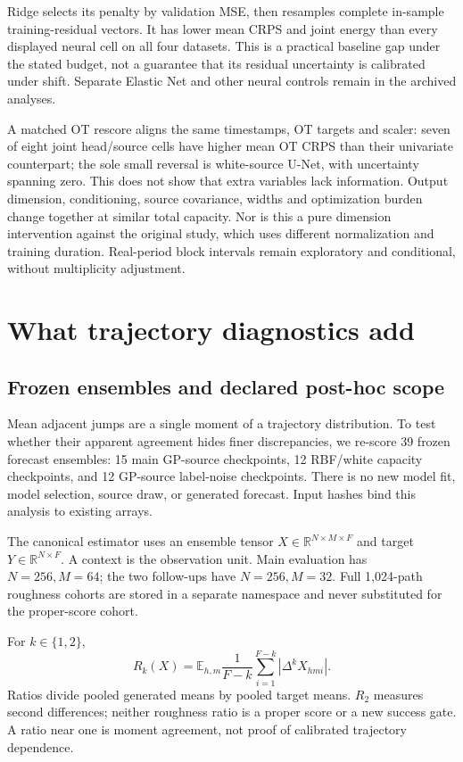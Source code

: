 \documentclass[10pt,twocolumn]{article}
\newcommand{\E}{\mathbb{E}}
\newcommand{\R}{\mathbb{R}}
\begin{document}
Ridge selects its penalty by validation MSE, then resamples complete in-sample training-residual vectors. It has lower mean CRPS and joint energy than every displayed neural cell on all four datasets. This is a practical baseline gap under the stated budget, not a guarantee that its residual uncertainty is calibrated under shift. Separate Elastic Net and other neural controls remain in the archived analyses.

A matched OT rescore aligns the same timestamps, OT targets and scaler: seven of eight joint head/source cells have higher mean OT CRPS than their univariate counterpart; the sole small reversal is white-source U-Net, with uncertainty spanning zero. This does not show that extra variables lack information. Output dimension, conditioning, source covariance, widths and optimization burden change together at similar total capacity. Nor is this a pure dimension intervention against the original study, which uses different normalization and training duration. Real-period block intervals remain exploratory and conditional, without multiplicity adjustment.

\clearpage
\section{What trajectory diagnostics add}
\subsection{Frozen ensembles and declared post-hoc scope}
Mean adjacent jumps are a single moment of a trajectory distribution. To test whether their apparent agreement hides finer discrepancies, we re-score 39 frozen forecast ensembles: 15 main GP-source checkpoints, 12 RBF/white capacity checkpoints, and 12 GP-source label-noise checkpoints. There is no new model fit, model selection, source draw, or generated forecast. Input hashes bind this analysis to existing arrays.

The canonical estimator uses an ensemble tensor $X\in\R^{N\times M\times F}$ and target $Y\in\R^{N\times F}$. A context is the observation unit. Main evaluation has $N=256,M=64$; the two follow-ups have $N=256,M=32$. Full 1,024-path roughness cohorts are stored in a separate namespace and never substituted for the proper-score cohort.

For $k\in\{1,2\}$,
\begin{equation}
 R_k(X)=\E_{h,m}\frac{1}{F-k}\sum_{i=1}^{F-k}|\Delta^k X_{hmi}|.
\end{equation}
Ratios divide pooled generated means by pooled target means. $R_2$ measures second differences; neither roughness ratio is a proper score or a new success gate. A ratio near one is moment agreement, not proof of calibrated trajectory dependence.
\end{document}
